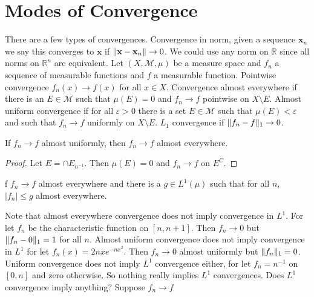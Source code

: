 \documentclass[crop=false,class=article]{standalone}                           %
\begin{document}
    \section{Modes of Convergence}
        There are a few types of convergences. Convergence in norm, given a
        sequence $\mathbf{x}_{n}$ we say this converges to $\mathbf{x}$ if
        $\lVert\mathbf{x}-\mathbf{x}_{n}\rVert\rightarrow{0}$. We could use any norm
        on $\mathbb{R}$ since all norms on $\mathbb{R}^{n}$ are equivalent.
        Let $(X,\mathcal{M},\mu)$ be a measure space and $f_{n}$ a sequence of
        measurable functions and $f$ a measurable function. Pointwise
        convergence $f_{n}(x)\rightarrow{f}(x)$ for all $x\in{X}$. Convergence
        almost everywhere if there is an $E\in\mathcal{M}$ such that $\mu(E)=0$
        and $f_{n}\rightarrow{f}$ pointwise on $X\setminus{E}$. Almost
        uniform convergence if for all $\varepsilon>0$ there is a set
        $E\in\mathcal{M}$ such that $\mu(E)<\varepsilon$ and such that
        $f_{n}\rightarrow{f}$ uniformly on $X\setminus{E}$. $L_{1}$ convergence
        if $\lVert f_{n}-f\rVert_{1}\rightarrow{0}$.
        \begin{theorem}
            If $f_{n}\rightarrow{f}$ almost uniformly, then
            $f_{n}\rightarrow{f}$ almost everywhere.
        \end{theorem}
        \begin{proof}
            Let $E=\cap{E}_{n^{\minus{1}}}$. Then $\mu(E)=0$ and
            $f_{n}\rightarrow{f}$ on $E^{C}$.
        \end{proof}
        \begin{theorem}
            f $f_{n}\rightarrow{f}$ almost everywhere and there is a
            $g\in{L}^{1}(\mu)$ such that for all $n$, $|f_{n}|\leq{g}$ almost
            everywhere.
        \end{theorem}
        Note that almost everywhere convergence does not imply convergence in
        $L^{1}$. For let $f_{n}$ be the characteristic function on $[n,n+1]$.
        Then $f_{n}\rightarrow{0}$ but $\lVert f_{n}-0\rVert_{1}=1$ for all $n$.
        Almost uniform convergence does not imply convergence in $L^{1}$ for let
        $f_{n}(x)=2nxe^{\minus{nx^{2}}}$. Then $f_{n}\rightarrow{0}$ almost
        uniformly but $\lVert f_{n}\rVert_{1}=0$. Uniform convergence does not imply
        $L^{1}$ convergence either, for let $f_{n}=n^{\minus{1}}$ on $[0,n]$
        and zero otherwise. So nothing really implies $L^{1}$ convergences.
        Does $L^{1}$ convergence imply anything? Suppose $f_{n}\rightarrow{f}$
\end{document}
